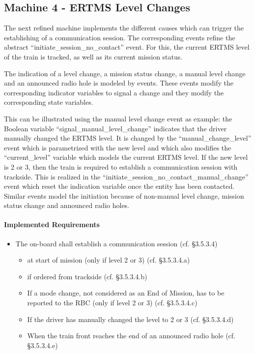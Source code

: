 \documentclass[10pt,a4paper]{article}
\begin{document}
\subsection{Machine 4 - ERTMS Level Changes}
\label{sec:machine-4-ertms}

The next refined machine implements the different causes which can trigger the
establishing of a communication session. The corresponding events refine the
abstract ``initiate\_session\_no\_contact'' event. For this, the current ERTMS
level of the train is tracked, as well as its current mission status.

The indication of a level change, a mission status change, a manual level change
and an announced radio hole is modeled by events. These events modify the
corresponding indicator variables to signal a change and they modify the
corresponding state variables.

This can be illustrated using the manual level change event as example: the
Boolean variable ``signal\_manual\_level\_change'' indicates that the driver
manually changed the ERTMS level. It is changed by the ``manual\_change\_level''
event which is parametrized with the new level and which also modifies the
``current\_level'' variable which models the current ERTMS level. If the new
level is 2 or 3, then the train is required to establish a communication session
with trackside. This is realized in the
``initiate\_session\_no\_contact\_manual\_change'' event which reset the
indication variable once the entity has been contacted.  Similar events model
the initiation because of non-manual level change, mission status change and
announced radio holes.

\paragraph{Implemented Requirements}
\label{sec:impl-requ-3}

\begin{itemize}
\item The on-board shall establish a communication session (cf. §3.5.3.4)
  \begin{itemize}
  \item at start of mission (only if level 2 or 3) (cf. §3.5.3.4.a)
  \item if ordered from trackside (cf. §3.5.3.4.b)
  \item If a mode change, not considered as an End of Mission, has to be
    reported to the RBC (only if level 2 or 3) (cf. §3.5.3.4.c)
  \item If the driver has manually changed the level to 2 or 3 (cf. §3.5.3.4.d)
  \item When the train front reaches the end of an announced radio hole
    (cf. §3.5.3.4.e)
  \end{itemize}
\end{itemize}
\end{document}
